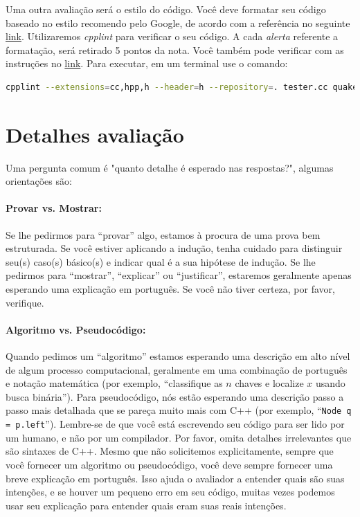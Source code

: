 \documentclass{article}
\begin{document}
Uma outra avaliação será o estilo do código. Você deve formatar seu código baseado no estilo recomendo pelo  Google, de acordo com a referência no seguinte \href{https://google.github.io/styleguide/cppguide.html}{link}. 
%
Utilizaremos \textit{cpplint} para verificar o seu código. A cada \textit{alerta} referente a formatação, será retirado 5 pontos da nota. Você também pode verificar com as instruções no \href{https://github.com/cpplint/cpplint}{link}. Para executar, em um terminal use o comando:  

\begin{lstlisting}[language=bash]
cpplint --extensions=cc,hpp,h --header=h --repository=. tester.cc quake_heap.h quake_heap.hpp
\end{lstlisting}


\newpage
\appendix

\section{Detalhes avaliação}
Uma pergunta comum é "quanto detalhe é esperado nas respostas?", algumas orientações são:
%
\paragraph{Provar vs. Mostrar:}
Se lhe pedirmos para “provar” algo, estamos à procura de uma prova bem estruturada. Se você estiver aplicando a indução, tenha cuidado para distinguir seu(s) caso(s) básico(s) e indicar qual é a sua hipótese de indução. Se lhe pedirmos para “mostrar”, “explicar” ou “justificar”, estaremos geralmente apenas esperando uma explicação em português. Se você não tiver certeza, por favor, verifique.

\paragraph{Algoritmo vs. Pseudocódigo:} Quando pedimos um “algoritmo” estamos esperando uma descrição em alto nível de algum processo computacional, geralmente em uma combinação de português e notação matemática (por exemplo, “classifique as $n$ chaves e localize $x$ usando busca binária”). Para pseudocódigo, nós estão esperando uma descrição passo a passo mais detalhada que se pareça muito mais com C++ (por exemplo, “\texttt{Node q = p.left}”). Lembre-se de que você está escrevendo seu código para ser lido por um humano, e não por um compilador. Por favor, omita detalhes irrelevantes que são sintaxes de C++. Mesmo que não solicitemos explicitamente, sempre que você fornecer um algoritmo ou pseudocódigo, você deve sempre fornecer uma breve explicação em português. Isso ajuda o avaliador a entender quais são suas intenções, e se houver um pequeno erro em seu código, muitas vezes podemos usar seu explicação para entender quais eram suas reais intenções.
\end{document}
